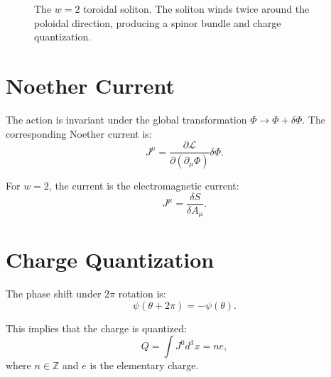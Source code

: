 \documentclass[12pt,oneside]{book}
\begin{document}
\begin{figure}[H]
\centering
{}
\caption{The $w=2$ toroidal soliton. The soliton winds twice around the poloidal direction, producing a spinor bundle and charge quantization.}
\label{fig:w2_soliton}
\end{figure}

\section{Noether Current}

The action is invariant under the global transformation $\Phi \to \Phi + \delta\Phi$. The corresponding Noether current is:
\[
J^\mu = \frac{\partial \mathcal{L}}{\partial(\partial_\mu \Phi)} \delta\Phi.
\]

For $w=2$, the current is the electromagnetic current:
\[
J^\mu = \frac{\delta S}{\delta A_\mu}.
\]

\section{Charge Quantization}

The phase shift under $2\pi$ rotation is:
\[
\psi(\theta+2\pi) = -\psi(\theta).
\]

This implies that the charge is quantized:
\[
Q = \int J^0 d^3x = n e,
\]
where $n \in \mathbb{Z}$ and $e$ is the elementary charge.
\end{document}
